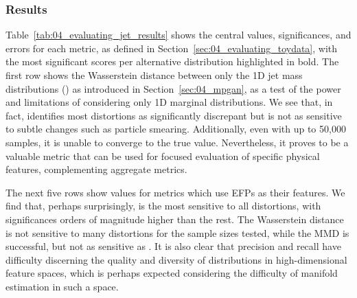 \subsubsection{Results}
\label{sec:04_evaluating_jetdata_results}

\begin{table}[ht!]
\caption[Values, significances, and errors of metrics for each jet distribution.]{Values, significances, and errors of metrics, as defined in Sections~\ref{sec:04_evaluating_toydata} and~\ref{sec:04_evaluating_jetdata}, for each jet distribution, for the largest sample size tested. EFP and PN refer to metrics using EFPs and ParticleNet activations as their input features, respectively.
The most significant scores per distribution are in bold.\label{tab:04_evaluating_jet_results}}
\centering{}
\end{table}

Table~\ref{tab:04_evaluating_jet_results} shows the central values, significances, and errors for each metric, as defined in Section~\ref{sec:04_evaluating_toydata}, with the most significant scores per alternative distribution highlighted in bold.
The first row shows the Wasserstein distance between only the 1D jet mass distributions (\wassm) as introduced in Section~\ref{sec:04_mpgan}, as a test of the power and limitations of considering only 1D marginal distributions.
We see that, in fact, \wassm identifies most distortions as significantly discrepant but is not as sensitive to subtle changes such as particle \ptrel smearing.
Additionally, even with up to 50,000 samples, it is unable to converge to the true value.
Nevertheless, it proves to be a valuable metric that can be used for focused evaluation of specific physical features, complementing aggregate metrics.

The next five rows show values for metrics which use EFPs as their features.
We find that, perhaps surprisingly, \fgdinf is the most sensitive to all distortions, with significances orders of magnitude higher than the rest.
The Wasserstein distance is not sensitive to many distortions for the sample sizes tested, while the MMD is successful, but not as sensitive as \fgdinf.
It is also clear that precision and recall have difficulty discerning the quality and diversity of distributions in high-dimensional feature spaces, which is perhaps expected considering the difficulty of manifold estimation in such a space.

